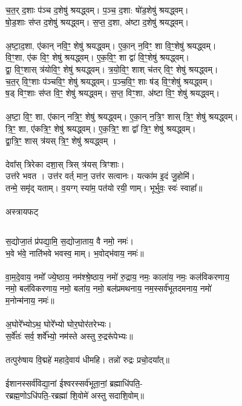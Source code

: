 च॒त॒र् द॒शाः प॑ञ्च द॒शेषु॑ श्रयद्ध्वम्। प॒ञ्च॒ द॒शा: षो॑ड॒शेषु॑ श्रयद्ध्वम्। \\
षो॒ड॒शाः स॑प्त द॒शेषु॑ श्रयद्ध्वम्। स॒प्त॒ द॒शा, अ॑ष्टा द॒शेषु॑ श्रयद्ध्वम्।\\
\\
अ॒ष्टा॒द॒शा, ए॑कान् नवि॒ꣳ॒ शेषु॑ श्रयद्ध्वम्। ए॒का॒न् न॒विꣳ॒ शा वि॒ꣳ॒शेषु॑ श्रयद्ध्वम्। \\
वि॒ꣳ॒शा, ए॑क वि॒ꣳ॒ शेषु॑ श्रयद्ध्वम्। ए॒क॒वि॒ꣳ॒ शा द्वा॑ वि॒ꣳ॒शेषु॑ श्रयद्ध्वम्। \\
द्वा॒ वि॒ꣳ॒शास् त्र॑योवि॒ꣳ॒ शेषु॑ श्रयद्ध्वम्। त्र॒यो॒वि॒ꣳ॒ शाश् च॑तर् वि॒ꣳ॒ शेषु॑ श्रयद्ध्वम्। \\
च॒त॒र् वि॒ꣳ॒शाः प॑ञ्चवि॒ꣳ॒ शेषु॑ श्रयद्ध्वम्। प॒ञ्च॒वि॒ꣳ॒ शाः ष॑ड् वि॒ꣳ॒शेषु॑ श्रयद्ध्वम्। \\
ष॒ड् विꣳ॒शाः स॑प्त वि॒ꣳ॒ शेषु॑ श्रयद्ध्वम्। स॒प्त॒ विꣳ॒शा, अ॑ष्टा वि॒ꣳ॒ शेषु॑ श्रयद्ध्वम्। \\
\\
अ॒ष्टा॒ वि॒ꣳ॒ शा, ए॑कान् नत्रि॒ꣳ॒ शेषु॑ श्रयद्ध्वम्। ए॒का॒न् न॒त्रि॒ꣳ शास् त्रि॒ꣳ॒ शेषु॑ श्रयद्ध्वम्। \\
त्रि॒ꣳ॒ शा, ए॑कत्रि॒ꣳ॒ शेषु॑ श्रयद्ध्वम्। ए॒क॒त्रि॒ꣳ॒ शा द्वा᳚ त्रि॒ꣳ॒ शेषु॑ श्रयद्ध्वम्।\\
द्वा॒त्रि॒ꣳ॒ शास् त्र॑यस् त्रि॒ꣳ॒ शेषु॑ श्रयद्ध्वम् । \\
\\
देवा᳚स् त्रिरेका दशा॒स् त्रिस् त्र॑यस् त्रिꣳशाः। \\
उत्त॑रे भवत । उत्त॑र वर्त् मान॒ उत्त॑र सत्वानः। यत्का॑म इ॒दं जु॒होमि॑।\\
तन्मे॒ समृ॑द् यताम्। व॒यग्ग् स्या॑म॒ पत॑यो रयी॒ णाम्। भूर्भुवः॒ स्वः॑ स्वाहा᳚॥\\
\\
अस्त्रायफट्\\
\subsection{}
स॒द्योजा॒तं प्र॑पद्या॒मि॒ स॒द्योजा॒ताय॒ वै नमो॒ नमः॑। \\
भ॒वे भ॑वे॒ नाति॑भवे भवस्व॒ माम्। भ॒वोद्भ॑वाय॒ नमः॑॥\\
\\
वा॒म॒दे॒वाय॒ नमो᳚ ज्ये॒ष्ठाय॒ नम॑श्श्रे॒ष्ठाय॒ नमो॑ रु॒द्राय॒ नमः॒ काला॑य॒ नमः॒ कल॑विकरणाय॒\\
नमो॒ बल॑विकरणाय॒ नमो॒ बला॑य॒ नमो॒ बल॑प्रमथनाय॒ नम॒स्सर्व॑भूतदमनाय॒ नमो॑\\
म॒नोन्म॑नाय॒ नमः॑॥\\
\\
अ॒घोरे᳚भ्योऽथ॒ घोरे᳚भ्यो घोर॒घोर॑तरेभ्यः। \\
स॒र्वे᳚तः॑ सर्व॒ शर्वे᳚भ्यो॒ नम॑स्ते अस्तु रु॒द्ररू॑पेभ्यः॥\\
\\
तत्पुरु॑षाय वि॒द्महे॑ महादे॒वाय॑ धीमहि। तन्नो॑ रुद्रः प्रचो॒दया᳚त्॥\\
\\
ईशानस्सर्व॑विद्या॒नां ईश्वरस्सर्व॑भूता॒नां॒ ब्रह्माधि॑पति॒-\\
रब्रह्म॒णोऽधि॑पति॒-रब्रह्मा॑ शि॒वोमे॑ अस्तु सदाशि॒वोम्॥\\
